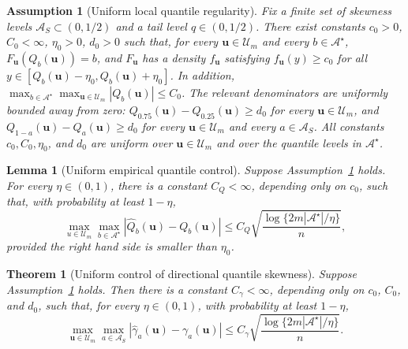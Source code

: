 \documentclass[10pt,a4paper]{amsart}
\newtheorem{assumption}{Assumption}
\newtheorem{lemma}{Lemma}
\newtheorem{theorem}{Theorem}
\newcommand{\abs}[1]{\left\lvert #1 \right\rvert}
\def\u{\bm{u}}
\begin{document}
\begin{assumption}[Uniform local quantile regularity]
	\label{ass:uniform_quantile_regular}
	Fix a finite set of skewness levels \(\mathcal A_S\subset(0,1/2)\) and a tail level \(q\in(0,1/2)\). There exist constants \(c_0>0\), \(C_0<\infty\), \(\eta_0>0\), \(d_0>0\) such that, for every \(\u\in\mathcal U_m\) and every \(b\in\mathcal A^\star\), \(F_{\u}(Q_b(\u))=b\), and \(F_{\u}\) has a density \(f_{\u}\) satisfying \(f_{\u}(y)\geqslant c_0\) for all \(y\in[Q_b(\u)-\eta_0,Q_b(\u)+\eta_0]\). In addition, \(\max_{b\in\mathcal A^\star}\max_{\u\in\mathcal U_m}|Q_b(\u)|\leqslant C_0\). The relevant denominators are uniformly bounded away from zero: \(Q_{0.75}(\u)-Q_{0.25}(\u)\geqslant d_0\) for every \(\u\in\mathcal U_m\), and \(Q_{1-a}(\u)-Q_a(\u)\geqslant d_0\) for every \(\u\in\mathcal U_m\) and every \(a\in\mathcal A_S\). All constants \(c_0,C_0,\eta_0\), and \(d_0\) are uniform over \(\u\in\mathcal U_m\) and over the quantile levels in \(\mathcal A^\star\).
\end{assumption}

\begin{lemma}[Uniform empirical quantile control]
	\label{lem:uniform_quantile_control}
	Suppose Assumption~\ref{ass:uniform_quantile_regular} holds. For every \(\eta\in(0,1)\), there is a constant \(C_Q<\infty\), depending only on \(c_0\), such that, with probability at least \(1-\eta\),
	\[
	\max_{u\in\mathcal U_m}\max_{b\in\mathcal A^\star} \abs{\widehat Q_b(\u)-Q_b(\u)} \leqslant C_Q\sqrt{\frac{\log\{2m|\mathcal A^\star|/\eta\}}{n}},
	\]
	provided the right hand side is smaller than \(\eta_0\).
\end{lemma}

\begin{theorem}[Uniform control of directional quantile skewness]
	\label{thm:uniform_quantile_skewness_concentration}
	Suppose Assumption~\ref{ass:uniform_quantile_regular} holds. Then there is a constant \(C_\gamma<\infty\), depending only on \(c_0\), \(C_0\), and \(d_0\), such that, for every \(\eta\in(0,1)\), with probability at least \(1-\eta\),
	\[
	\max_{\u\in\mathcal U_m}\max_{a\in\mathcal A_S} \abs{\widehat\gamma_{a}(\u)-\gamma_{a}(\u)} \leqslant C_\gamma
	\sqrt{\frac{\log\{2m \abs{\mathcal A^\star}/\eta\}}{n}}.
	\]
\end{theorem}
\end{document}
